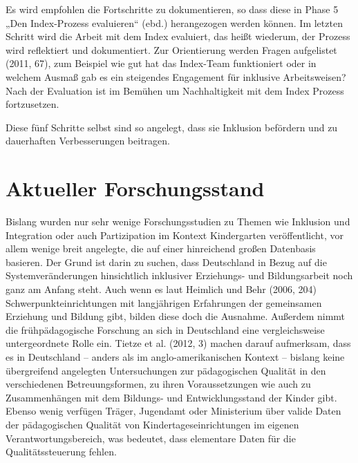 Es wird empfohlen die Fortschritte zu dokumentieren, so dass diese in Phase 5 „Den Index-Prozess evaluieren“ (ebd.) herangezogen werden können. Im letzten Schritt wird die Arbeit mit dem Index evaluiert, das heißt wiederum, der Prozess wird reflektiert und dokumentiert. Zur Orientierung werden Fragen aufgelistet (2011, 67), zum Beispiel wie gut hat das Index-Team funktioniert oder in welchem Ausmaß gab es ein steigendes Engagement für inklusive Arbeitsweisen? Nach der Evaluation ist im Bemühen um Nachhaltigkeit mit dem Index Prozess fortzusetzen. 
  
Diese fünf Schritte selbst sind so angelegt, dass sie Inklusion befördern und zu dauerhaften Verbesserungen beitragen.

\section{Aktueller Forschungsstand}\label{Forschung}

Bislang wurden nur sehr wenige Forschungsstudien zu Themen wie Inklusion und Integration oder auch Partizipation im Kontext Kindergarten veröffentlicht, vor allem wenige breit angelegte, die auf einer hinreichend großen Datenbasis basieren. Der Grund ist darin zu suchen, dass Deutschland in Bezug auf die Systemveränderungen hinsichtlich inklusiver Erziehungs- und Bildungsarbeit noch ganz am Anfang steht. Auch wenn es laut Heimlich und Behr (2006, 204) Schwerpunkteinrichtungen mit langjährigen Erfahrungen der gemeinsamen Erziehung und Bildung gibt, bilden diese doch die Ausnahme.  
Außerdem nimmt die frühpädagogische Forschung an sich in Deutschland eine vergleichsweise untergeordnete Rolle ein. 
Tietze et al. (2012, 3) machen darauf aufmerksam, dass es in Deutschland – anders als im anglo-amerikanischen Kontext – bislang keine übergreifend angelegten Untersuchungen zur pädagogischen Qualität in den verschiedenen Betreuungsformen, zu ihren Voraussetzungen wie auch zu Zusammenhängen mit dem Bildungs- und Entwicklungsstand der Kinder gibt. Ebenso wenig verfügen Träger, Jugendamt oder Ministerium über valide Daten der pädagogischen Qualität von Kindertageseinrichtungen im eigenen Verantwortungsbereich, was bedeutet, dass elementare Daten für die Qualitätssteuerung fehlen.

